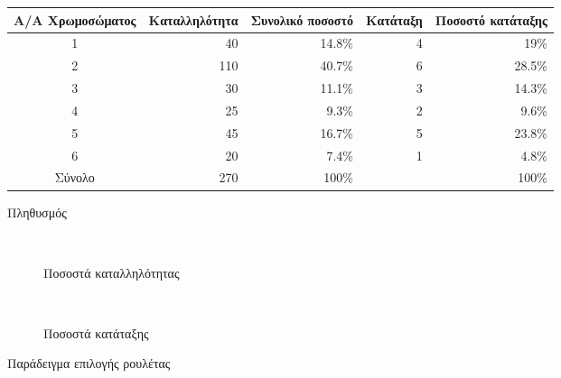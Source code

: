 \begin{figure*}[!t]
    \centering
    \begin{subtable}[t!]{\linewidth}
        \centering
        \begin{tabular}{@{}crrrr@{}}
            \toprule
            Α/Α Χρωμοσώματος & Καταλληλότητα & Συνολικό ποσοστό & Κατάταξη & Ποσοστό κατάταξης \\ \midrule
            1                & 40            & 14.8\%           & 4        & 19\%              \\
            2                & 110           & 40.7\%           & 6        & 28.5\%            \\
            3                & 30            & 11.1\%           & 3        & 14.3\%            \\
            4                & 25            & 9.3\%            & 2        & 9.6\%             \\
            5                & 45            & 16.7\%           & 5        & 23.8\%            \\
            6                & 20            & 7.4\%            & 1        & 4.8\%             \\ \midrule
            Σύνολο           & 270           & 100\%            &          & 100\%             \\ \bottomrule
        \end{tabular}
        \caption{Πληθυσμός}
    \end{subtable}
    \\
    \begin{subfigure}[t!]{.4\linewidth}
        \centering
        \caption{Ποσοστά καταλληλότητας}
    \end{subfigure}
    ~
    \begin{subfigure}[t!]{.4\linewidth}
        \centering
        \caption{Ποσοστά κατάταξης}
    \end{subfigure}

    \caption{Παράδειγμα επιλογής ρουλέτας}
    \label{fig_rouletteWheel}
\end{figure*}

